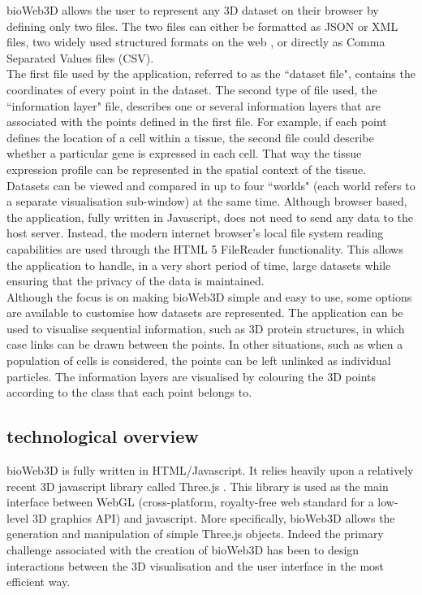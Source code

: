 \documentclass[10pt]{bmc_article}
\newenvironment{bmcformat}{\baselineskip20pt\sloppy\setboolean{publ}{false}}{\baselineskip20pt\sloppy}
\begin{document}
\begin{bmcformat}
bioWeb3D allows the user to represent any 3D dataset on their browser by defining only two files. The two files can either be formatted as JSON or XML files, two widely used structured formats on the web \cite{Wilde07} \cite{xml}, or directly as Comma Separated Values files (CSV).\\
The first file used by the application, referred to as the ``dataset file", contains the coordinates of every point in the dataset. The second type of file used, the ``information layer" file, describes one or several information layers that are associated with the points defined in the first file. For example, if each point defines the location of a cell within a tissue, the second file could describe whether a particular gene is expressed in each cell. That way the tissue expression profile can be represented in the spatial context of the tissue.\\
Datasets can be viewed and compared in up to four ``worlds" (each world refers to a separate visualisation sub-window) at the same time. Although browser based, the application, fully written in Javascript, does not need to send any data to the host server. Instead, the modern internet browser's local file system reading capabilities are used through the HTML 5 FileReader functionality. This allows the application to handle, in a very short period of time, large datasets while ensuring that the privacy of the data is maintained.\\
Although the focus is on making bioWeb3D simple and easy to use, some options are available to customise how datasets are represented. The application can be used to visualise sequential information, such as 3D protein structures, in which case links can be drawn between the points. In other situations, such as when a population of cells is considered, the points can be left unlinked as individual particles. The information layers are visualised by colouring the 3D points according to the class that each point belongs to.
\subsection{technological overview}
bioWeb3D is fully written in HTML/Javascript. It relies heavily upon a relatively recent 3D javascript library called Three.js \cite{three}. This library is used as the main interface between WebGL (cross-platform, royalty-free web standard for a low-level 3D graphics API) \cite{webgl} and javascript. More specifically, bioWeb3D allows the generation and manipulation of simple Three.js objects. Indeed the primary challenge associated with the creation of bioWeb3D has been to design interactions between the 3D visualisation and the user interface in the most efficient way.\\

\end{bmcformat}
\end{document}
